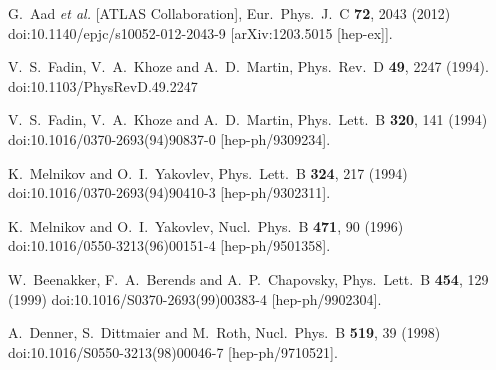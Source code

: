 \documentclass[11pt,a4paper]{article}
\begin{document}
\begin{thebibliography}{99}
  G.~Aad {\it et al.} [ATLAS Collaboration],
  Eur.\ Phys.\ J.\ C {\bf 72}, 2043 (2012)
  doi:10.1140/epjc/s10052-012-2043-9
  [arXiv:1203.5015 [hep-ex]].


  V.~S.~Fadin, V.~A.~Khoze and A.~D.~Martin,
  Phys.\ Rev.\ D {\bf 49}, 2247 (1994).
  doi:10.1103/PhysRevD.49.2247


  V.~S.~Fadin, V.~A.~Khoze and A.~D.~Martin,
  Phys.\ Lett.\ B {\bf 320}, 141 (1994)
  doi:10.1016/0370-2693(94)90837-0
  [hep-ph/9309234].


  K.~Melnikov and O.~I.~Yakovlev,
  Phys.\ Lett.\ B {\bf 324}, 217 (1994)
  doi:10.1016/0370-2693(94)90410-3
  [hep-ph/9302311].


  K.~Melnikov and O.~I.~Yakovlev,
  Nucl.\ Phys.\ B {\bf 471}, 90 (1996)
  doi:10.1016/0550-3213(96)00151-4
  [hep-ph/9501358].


  W.~Beenakker, F.~A.~Berends and A.~P.~Chapovsky,
  Phys.\ Lett.\ B {\bf 454}, 129 (1999)
  doi:10.1016/S0370-2693(99)00383-4
  [hep-ph/9902304].


  A.~Denner, S.~Dittmaier and M.~Roth,
  Nucl.\ Phys.\ B {\bf 519}, 39 (1998)
  doi:10.1016/S0550-3213(98)00046-7
  [hep-ph/9710521].



\end{thebibliography}
\end{document}
